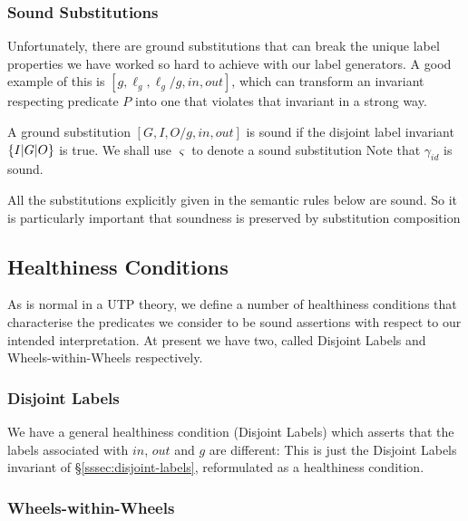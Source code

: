 \subsubsection{Sound Substitutions}

Unfortunately, there are ground substitutions
that can break the unique label properties
we have worked so hard to achieve with our label generators.
A good example of this is $[g,\ell_g,\ell_g/g,in,out]$,
which can transform an invariant respecting predicate $P$
into one that violates that invariant in a strong way.

A ground substitution $[G,I,O/g,in,out]$ is sound
if the disjoint label invariant $\{I|G|O\}$ is true.
We shall use $\varsigma$ to denote a sound substitution
Note that $\gamma_{id}$ is sound.

All the substitutions explicitly given in the semantic rules below
are sound.
So it is particularly important that soundness is preserved by
substitution composition




\subsection{Healthiness Conditions}

As is normal in a UTP theory,
we define a number of healthiness conditions
that characterise the predicates we consider to be sound assertions
with respect to our intended interpretation.
At present we have two, called Disjoint Labels
and Wheels-within-Wheels respectively.

\subsubsection{Disjoint Labels}\label{sssec:disj-labels}

We have a general healthiness condition (Disjoint Labels) which asserts
that the labels associated with $in$, $out$ and $g$
are different:
This is just the Disjoint Labels invariant of \S\ref{sssec:disjoint-labels},
reformulated as a healthiness condition.

\subsubsection{Wheels-within-Wheels}\label{sssec:WwW}

